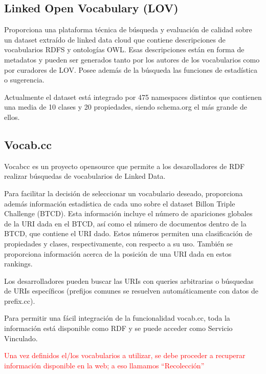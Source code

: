 \subsection{Linked Open Vocabulary (LOV)}

Proporciona una plataforma técnica de búsqueda y evaluación de calidad sobre un dataset extraído de linked data cloud que contiene descripciones de vocabularios RDFS 
y ontologías OWL. Esas descripciones están en forma de metadatos y pueden ser generados tanto por los autores de los vocabularios como por curadores de LOV.
Posee además de la búsqueda las funciones de estadística o sugerencia.

Actualmente el dataset está integrado por 475 namespaces distintos que contienen una media de 10 clases y 20 propiedades, siendo schema.org el más grande de ellos.

\subsection{Vocab.cc}
Vocabcc es un proyecto opensource que permite a los desarolladores de RDF realizar búsquedas de vocabularios de Linked Data.

Para facilitar la decisión de seleccionar un vocabulario deseado, proporciona además información estadística de cada uno sobre el dataset Billon Triple Challenge (BTCD). 
 Esta información incluye el número de apariciones globales de la URI dada en el BTCD, así como el número de documentos dentro de la BTCD, que contiene el URI dado. Estos números permiten una clasificación de propiedades y clases, respectivamente, con respecto a su uso. También se proporciona información acerca de la posición de una URI dada en estos rankings.

Los desarrolladores pueden buscar las URIs con queries arbitrarias o búsquedas de URIs específicos (prefijos comunes se resuelven automáticamente con datos de prefix.cc).

Para permitir una fácil integración de la funcionalidad vocab.cc, toda la información está disponible como RDF y se puede acceder como Servicio Vinculado.

\begin{framed}
\textcolor{red}{Una vez definidos el/los vocabularios a utilizar, se debe proceder a recuperar información disponible en la web; a eso llamamos ``Recolección''}
\end{framed}

